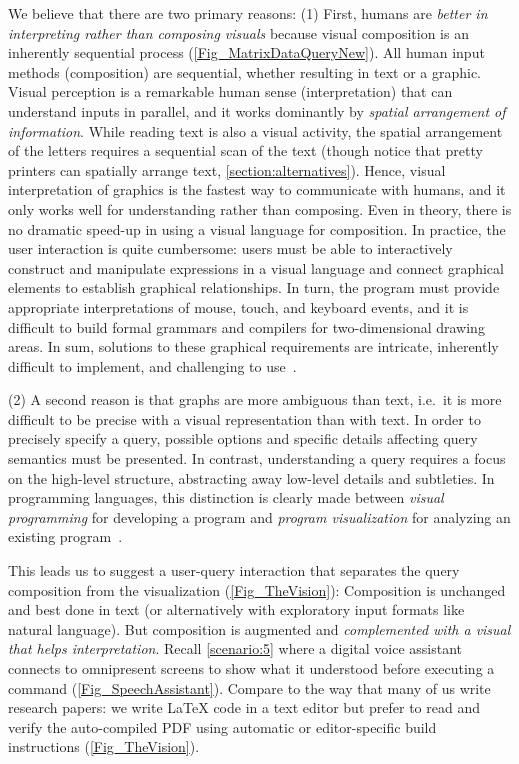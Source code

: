 \documentclass[letterpaper,11pt]{article}
\begin{document}
We believe that there are two primary reasons:
(1) First, humans are \emph{better in interpreting rather than composing visuals} because visual composition is an inherently sequential process (\autoref{Fig_MatrixDataQueryNew}).
All human input methods (composition) are sequential, whether resulting in text or a graphic. Visual perception is a remarkable human sense (interpretation) that can 
understand inputs
in parallel,
%
and it works dominantly by \emph{spatial arrangement of information}. 
While reading text is also a visual activity, the spatial arrangement of the letters requires a sequential scan of the text 
(though notice that pretty printers can spatially arrange text, \autoref{section:alternatives}).
Hence, visual interpretation of graphics is the fastest way to communicate with humans, 
and it only works well for understanding rather than composing.
Even in theory, there is no dramatic speed-up 
%
in
using a visual language for composition. 
In practice, the user interaction is quite cumbersome: 
users must be able to interactively construct and manipulate expressions in a visual language and connect graphical elements 
to establish graphical relationships. In turn, the program must provide appropriate interpretations
 of mouse, touch, and keyboard events, 
 and it is difficult to build formal grammars and compilers for two-dimensional drawing areas. 
In sum, solutions to these graphical requirements are intricate, inherently difficult to implement, and challenging to use~\cite{Zhang:2007zr}. 
%








(2) A second reason is that graphs are more ambiguous than text, i.e.\ it is more difficult to be precise with a visual representation than with text. 
In order to precisely specify a query, possible options
and specific details affecting query semantics must be presented. 
In contrast, 
understanding a query requires a focus on the high-level structure, abstracting
away low-level details and subtleties. 
In programming languages, this distinction is clearly made between \emph{visual programming} for developing a program
and \emph{program visualization} for analyzing an existing program~\cite{MYERS199097}.
%
%






This leads us to suggest a user-query interaction 
that separates the query composition from the visualization (\autoref{Fig_TheVision}):
Composition is unchanged and best done in text 
(or alternatively with exploratory input
formats like natural language).
But composition is augmented and \emph{complemented with a visual that helps interpretation}. 
%
%
%
%
%
%
Recall \autoref{scenario:5} where a digital voice assistant connects to omnipresent screens to show what it understood before executing a command (\autoref{Fig_SpeechAssistant}).
Compare to the way that many of us write research papers: we write LaTeX code in a text editor but prefer to read and verify the auto-compiled PDF using automatic or editor-specific build instructions (\autoref{Fig_TheVision}).
%
\end{document}
